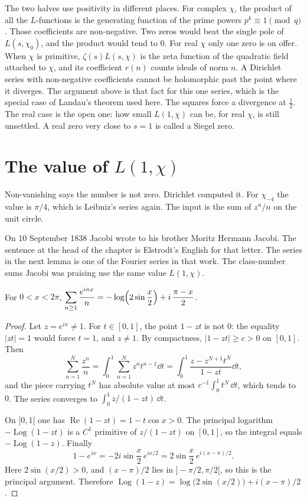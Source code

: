 \begin{beauty}
The two halves use positivity in different places. For complex $\chi$, the product of all the $L$-functions is the generating function of the prime powers $p^k\equiv1\pmod q$. Those coefficients are non-negative. Two zeros would beat the single pole of $L(s,\chi_0)$, and the product would tend to $0$. For real $\chi$ only one zero is on offer. When $\chi$ is primitive, $\zeta(s)L(s,\chi)$ is the zeta function of the quadratic field attached to $\chi$, and its coefficient $r(n)$ counts ideals of norm $n$. A Dirichlet series with non-negative coefficients cannot be holomorphic past the point where it diverges. The argument above is that fact for this one series, which is the special case of Landau's theorem used here. The squares force a divergence at $\frac12$. The real case is the open one: how small $L(1,\chi)$ can be, for real $\chi$, is still unsettled. A real zero very close to $s=1$ is called a Siegel zero.
\end{beauty}

\section{The value of \texorpdfstring{$L(1,\chi)$}{L(1,chi)}}

Non-vanishing says the number is not zero. Dirichlet computed it. For $\chi_{-4}$ the value is $\pi/4$, which is Leibniz's series again. The input is the sum of $z^n/n$ on the unit circle.

On 10 September 1838 Jacobi wrote to his brother Moritz Hermann Jacobi. The sentence at the head of the chapter is Elstrodt's English for that letter. The series in the next lemma is one of the Fourier series in that work. The class-number sums Jacobi was praising use the same value $L(1,\chi)$.

\begin{lemma}\label{lem:logseries}
For $0<x<2\pi$, $\displaystyle\sum_{n\ge1}\frac{e^{inx}}n=-\log\Bigl(2\sin\frac x2\Bigr)+i\,\frac{\pi-x}2$.
\end{lemma}
\begin{proof}
Let $z=e^{ix}\ne1$. For $t\in[0,1]$, the point $1-zt$ is not $0$: the equality $|zt|=1$ would force $t=1$, and $z\ne1$. By compactness, $|1-zt|\ge c>0$ on $[0,1]$. Then
\[
\sum_{n=1}^N\frac{z^n}n=\int_0^1\sum_{n=1}^Nz^nt^{n-1}\dd t=\int_0^1\frac{z-z^{N+1}t^N}{1-zt}\dd t,
\]
and the piece carrying $t^N$ has absolute value at most $c^{-1}\int_0^1 t^N\,\dd t$, which tends to $0$. The series converges to $\int_0^1 z/(1-zt)\,\dd t$.

On $[0,1[$ one has $\operatorname{Re}(1-zt)=1-t\cos x>0$. The principal logarithm $-\operatorname{Log}(1-zt)$ is a $C^1$ primitive of $z/(1-zt)$ on $[0,1]$, so the integral equals $-\operatorname{Log}(1-z)$. Finally
\[
1-e^{ix}=-2i\sin\frac x2\,e^{ix/2}=2\sin\frac x2\,e^{i(x-\pi)/2}.
\]
Here $2\sin(x/2)>0$, and $(x-\pi)/2$ lies in $\bigl]-\pi/2,\pi/2\bigr[$, so this is the principal argument. Therefore $\operatorname{Log}(1-z)=\log\bigl(2\sin(x/2)\bigr)+i(x-\pi)/2$.
\end{proof}

